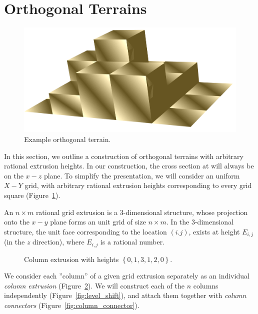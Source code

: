 \section{Orthogonal Terrains}
\label{sec:orthogonal_terrains}

\begin{figure}
    \vspace{-4.0em}
    \includegraphics[width=\linewidth]{figures/terrain.png}
    \caption{Example orthogonal terrain.}
    \label{fig:terrain}
    \vspace{-1.2em}
\end{figure}
In this section, we outline a construction of orthogonal terrains with arbitrary rational extrusion heights.
In our construction, the cross section at will always be on the $x-z$ plane.
To simplify the presentation, we will consider an uniform $X-Y$ grid,
with arbitrary rational extrusion heights corresponding to every grid square (Figure~\ref{fig:terrain}).
\begin{definition}
An $n\times m$ rational grid extrusion is a 3-dimensional structure,
whose projection onto the $x-y$ plane forms an unit grid of size $n\times m$.
In the 3-dimensional structure, the unit face corresponding to the location $(i.j)$,
exists at height $E_{i,j}$ (in the $z$ direction), where $E_{i,j}$ is a rational number.
\end{definition}

\graphicspath{{./figures/}}
\begin{figure}
    \vspace{-2.5em}
    \def\svgwidth{0.5\textwidth}
    \caption{Column extrusion with heights $\left\{ 0,1,3,1,2,0\right\}$.}
    \label{fig:column_extrusion}
    \vspace{-0.8em}
\end{figure}
We consider each ''column'' of a given grid extrusion separately
as an individual \emph{column extrusion} (Figure~\ref{fig:column_extrusion}).
We will construct each of the $n$ columns independently (Figure~\ref{fig:level_shift}),
and attach them together with \emph{column connectors} (Figure~\ref{fig:column_connector}).

